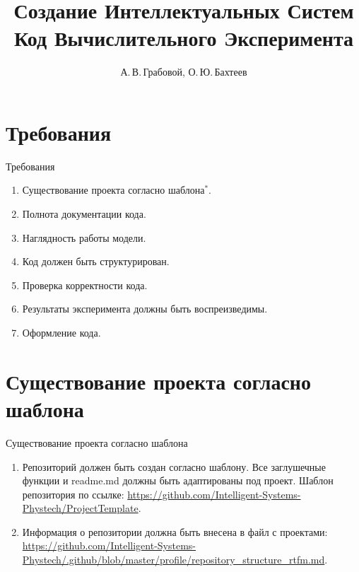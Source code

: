 \documentclass[10pt,pdf,hyperref={unicode}]{beamer}
\title[Вводная лекция]{Создание Интеллектуальных Систем \\ Код Вычислительного Эксперимента}
\author{А.\,В.\,Грабовой, О.\,Ю.\,Бахтеев}
\institute[]{Московский физико-технический институт}
\begin{document}
\begin{frame}
\titlepage
\end{frame}

\section{Требования}
\begin{frame}{Требования}
\bigskip

\begin{enumerate}
    \item Существование проекта согласно шаблона$^*$.
    \item Полнота документации кода.
    \item Наглядность работы модели.
    \item Код должен быть структурирован.
    \item Проверка корректности кода.
    \item Результаты эксперимента должны быть воспреизведимы.
    \item Оформление кода.
\end{enumerate}

\end{frame}

\section{Существование проекта согласно шаблона}
\begin{frame}{Существование проекта согласно шаблона}
\bigskip
\begin{enumerate}
    \item Репозиторий должен быть создан согласно шаблону. Все заглушечные функции и readme.md должны быть адаптированы под проект. Шаблон репозитория по ссылке: \url{https://github.com/Intelligent-Systems-Phystech/ProjectTemplate}.
    \item Информация о репозитории должна быть внесена в файл с проектами: \url{https://github.com/Intelligent-Systems-Phystech/.github/blob/master/profile/repository_structure_rtfm.md}.
\end{enumerate}
\end{frame}

\end{document}
